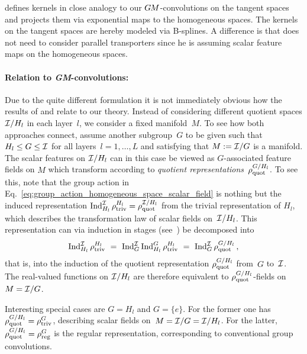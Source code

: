 \citet{bekkers2020bspline} defines kernels in close analogy to our $G\mkern-1.4muM$-convolutions on the tangent spaces and projects them via exponential maps to the homogeneous spaces.
The kernels on the tangent spaces are hereby modeled via B-splines.
A difference is that \citet{bekkers2020bspline} does not need to consider parallel transporters since he is assuming scalar feature maps on the homogeneous spaces.





\paragraph{Relation to \emph{GM}-convolutions:}

Due to the quite different formulation it is not immediately obvious how the results of \citet{Kondor2018-GENERAL} and \citet{bekkers2020bspline} relate to our theory.
Instead of considering different quotient spaces $\mathcal{I}/H_l$ in each layer~$l$, we consider a fixed manifold~$M$.
To see how both approaches connect, assume another subgroup~$G$ to be given such that $H_l \leq G \leq \mathcal{I}$ for all layers~$l=1,\dots,L$ and satisfying that $M := \mathcal{I}/G$ is a manifold.
The scalar features on $\mathcal{I}/H_l$ can in this case be viewed as $G$-associated feature fields on $M$ which transform according to \emph{quotient representations}~$\rho_\textup{quot}^{G/H_l}$.
To see this, note that the group action in Eq.~\eqref{eq:group_action_homogeneous_space_scalar_field} is nothing but the induced representation $\operatorname{Ind}_{H_l}^{\mathcal{I}} \rho_\textup{triv}^{H_l} = \rho_\textup{quot}^{\mathcal{I}/H_l}$ from the trivial representation of $H_l$, which describes the transformation law of scalar fields on~$\mathcal{I}/H_l$.
This representation can via induction in stages (see~\cite{ceccherini2009induced}) be decomposed into
\begin{align}
    \operatorname{Ind}_{H_l}^{\mathcal{I}} \rho_\textup{triv}^{H_l}
    \ =\ \operatorname{Ind}_G^{\mathcal{I}} \operatorname{Ind}_{H_l}^G \rho_\textup{triv}^{H_l}
    \ =\ \operatorname{Ind}_G^{\mathcal{I}} \rho_\textup{quot}^{G/H_l} \,,
\end{align}
that is, into the induction of the quotient representation $\rho_\textup{quot}^{G/H_l}$ from~$G$ to~$\mathcal{I}$.
The real-valued functions on $\mathcal{I}/H_l$ are therefore equivalent to $\rho_\textup{quot}^{G/H_l}$-fields on~$M=\mathcal{I}/G$.


Interesting special cases are $G=H_l$ and $G=\{e\}$.
For the former one has $\rho_\textup{quot}^{G/H_l} = \rho_\textup{triv}^G$, describing scalar fields on~$M = \mathcal{I}/G = \mathcal{I}/H_l$.
For the latter, $\rho_\textup{quot}^{G/H_l} = \rho_\textup{reg}^G$ is the regular representation, corresponding to conventional group convolutions.


